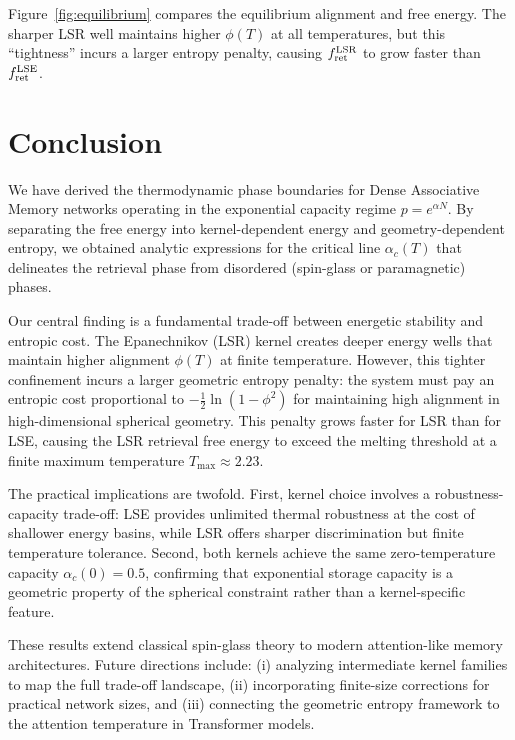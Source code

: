 \documentclass{article}
\theoremstyle{plain}
\theoremstyle{definition}
\theoremstyle{remark}
\begin{document}
Figure~\ref{fig:equilibrium} compares the equilibrium alignment and free energy. The sharper LSR well maintains higher $\phi(T)$ at all temperatures, but this ``tightness'' incurs a larger entropy penalty, causing $f_{\rm ret}^{\rm LSR}$ to grow faster than $f_{\rm ret}^{\rm LSE}$.

\section{Conclusion}

We have derived the thermodynamic phase boundaries for Dense Associative Memory networks operating in the exponential capacity regime $p = e^{\alpha N}$. By separating the free energy into kernel-dependent energy and geometry-dependent entropy, we obtained analytic expressions for the critical line $\alpha_c(T)$ that delineates the retrieval phase from disordered (spin-glass or paramagnetic) phases.

Our central finding is a fundamental trade-off between energetic stability and entropic cost. The Epanechnikov (LSR) kernel creates deeper energy wells that maintain higher alignment $\phi(T)$ at finite temperature. However, this tighter confinement incurs a larger geometric entropy penalty: the system must pay an entropic cost proportional to $-\frac{1}{2}\ln(1-\phi^2)$ for maintaining high alignment in high-dimensional spherical geometry. This penalty grows faster for LSR than for LSE, causing the LSR retrieval free energy to exceed the melting threshold at a finite maximum temperature $T_{\max} \approx 2.23$.

The practical implications are twofold. First, kernel choice involves a robustness-capacity trade-off: LSE provides unlimited thermal robustness at the cost of shallower energy basins, while LSR offers sharper discrimination but finite temperature tolerance. Second, both kernels achieve the same zero-temperature capacity $\alpha_c(0) = 0.5$, confirming that exponential storage capacity is a geometric property of the spherical constraint rather than a kernel-specific feature.

These results extend classical spin-glass theory to modern attention-like memory architectures. Future directions include: (i) analyzing intermediate kernel families to map the full trade-off landscape, (ii) incorporating finite-size corrections for practical network sizes, and (iii) connecting the geometric entropy framework to the attention temperature in Transformer models.
\end{document}
